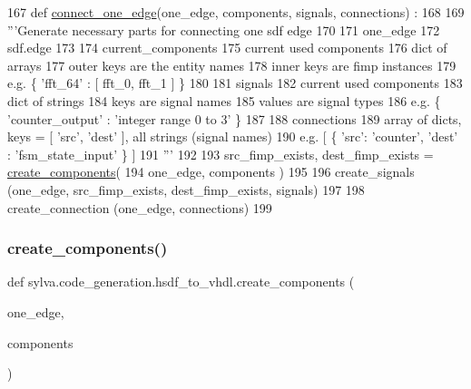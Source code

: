\begin{DoxyCode}
167 \textcolor{keyword}{def }\hyperlink{namespacesylva_1_1code__generation_1_1hsdf__to__vhdl_a5976ee6a55f22e1fc1e9fc87bac3ea62}{connect\_one\_edge}(one\_edge, components, signals, connections) :
168 
169   \textcolor{stringliteral}{'''Generate necessary parts for connecting one sdf edge}
170 \textcolor{stringliteral}{}
171 \textcolor{stringliteral}{    one\_edge}
172 \textcolor{stringliteral}{      sdf.edge}
173 \textcolor{stringliteral}{}
174 \textcolor{stringliteral}{    current\_components}
175 \textcolor{stringliteral}{      current used components}
176 \textcolor{stringliteral}{      dict of arrays}
177 \textcolor{stringliteral}{      outer keys are the entity names}
178 \textcolor{stringliteral}{      inner keys are fimp instances}
179 \textcolor{stringliteral}{      e.g. \{ 'fft\_64' : [ fft\_0, fft\_1 ] \}}
180 \textcolor{stringliteral}{}
181 \textcolor{stringliteral}{    signals}
182 \textcolor{stringliteral}{      current used components}
183 \textcolor{stringliteral}{      dict of strings}
184 \textcolor{stringliteral}{      keys are signal names}
185 \textcolor{stringliteral}{      values are signal types}
186 \textcolor{stringliteral}{      e.g. \{ 'counter\_output' : 'integer range 0 to 3' \}}
187 \textcolor{stringliteral}{}
188 \textcolor{stringliteral}{    connections}
189 \textcolor{stringliteral}{      array of dicts, keys = [ 'src', 'dest' ], all strings (signal names)}
190 \textcolor{stringliteral}{      e.g. [ \{ 'src': 'counter', 'dest' : 'fsm\_state\_input' \} ]}
191 \textcolor{stringliteral}{  '''}
192 
193   src\_fimp\_exists, dest\_fimp\_exists = \hyperlink{namespacesylva_1_1code__generation_1_1hsdf__to__vhdl_a3672bd3c4fb6d5c86df2d4cd1f64e875}{create\_components}(
194     one\_edge, components )
195 
196   create\_signals (one\_edge, src\_fimp\_exists, dest\_fimp\_exists, signals)
197 
198   create\_connection (one\_edge, connections)
199 
\end{DoxyCode}
\mbox{\label{namespacesylva_1_1code__generation_1_1hsdf__to__vhdl_a3672bd3c4fb6d5c86df2d4cd1f64e875}} 
\subsubsection{\texorpdfstring{create\+\_\+components()}{create\_components()}}
{\footnotesize\ttfamily def sylva.\+code\+\_\+generation.\+hsdf\+\_\+to\+\_\+vhdl.\+create\+\_\+components (\begin{DoxyParamCaption}\item[{}]{one\+\_\+edge,  }\item[{}]{components }\end{DoxyParamCaption})}

